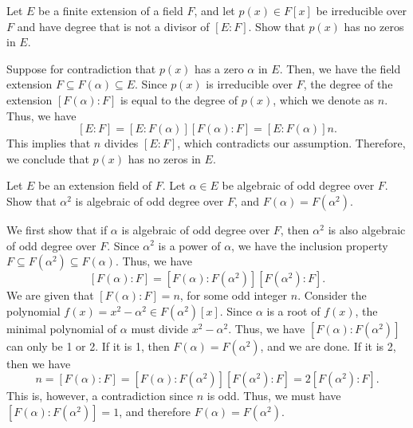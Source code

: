 \begin{problem}[40.29]
  Let $E$ be a finite extension of a field $F$, and let $p(x) \in F[x]$ be irreducible over $F$ and have degree that is not a divisor of $[E : F]$. Show that $p(x)$ has no zeros in $E$.
\end{problem}

\begin{solution}
  Suppose for contradiction that $p(x)$ has a zero $\alpha$ in $E$. Then, we have the field extension $F \subseteq F(\alpha) \subseteq E$. Since $p(x)$ is irreducible over $F$, the degree of the extension $[F(\alpha) : F]$ is equal to the degree of $p(x)$, which we denote as $n$. Thus, we have
  \[%
    [E : F] = [E : F(\alpha)][F(\alpha) : F] = [E : F(\alpha)]n
  .\]%
  This implies that $n$ divides $[E : F]$, which contradicts our assumption. Therefore, we conclude that $p(x)$ has no zeros in $E$.
\end{solution}

\begin{problem}[40.30]
  Let $E$ be an extension field of $F$. Let $\alpha \in E$ be algebraic of odd degree over $F$. Show that $\alpha^2$ is algebraic of odd degree over $F$, and $F(\alpha) = F(\alpha^2)$.
\end{problem}

\begin{solution}
  We first show that if $\alpha$ is algebraic of odd degree over $F$, then $\alpha^2$ is also algebraic of odd degree over $F$. Since $\alpha^2$ is a power of $\alpha$, we have the inclusion property $F \subseteq F(\alpha^2) \subseteq F(\alpha)$. Thus, we have
  \[%
    [F(\alpha) : F] = [F(\alpha) : F(\alpha^2)][F(\alpha^2) : F]
  .\]%
  We are given that $[F(\alpha) : F] = n$, for some odd integer $n$. Consider the polynomial $f(x) = x^2 - \alpha^2 \in F(\alpha^2)[x]$. Since $\alpha$ is a root of $f(x)$, the minimal polynomial of $\alpha$ must divide $x^2 - \alpha^2$. Thus, we have $[F(\alpha) : F(\alpha^2)]$ can only be 1 or 2. If it is 1, then $F(\alpha) = F(\alpha^2)$, and we are done. If it is 2, then we have
  \[%
    n = [F(\alpha) : F] = [F(\alpha) : F(\alpha^2)][F(\alpha^2) : F] = 2[F(\alpha^2) : F]
  .\]%
  This is, however, a contradiction since $n$ is odd. Thus, we must have $[F(\alpha) : F(\alpha^2)] = 1$, and therefore $F(\alpha) = F(\alpha^2)$.
\end{solution}
